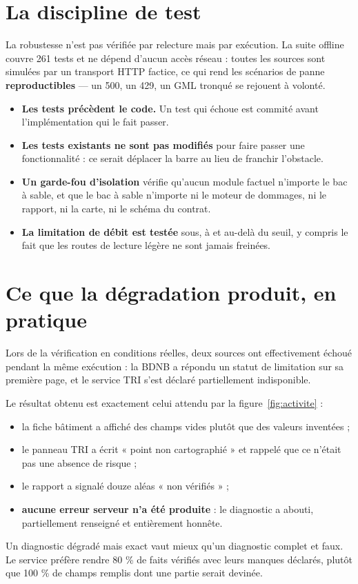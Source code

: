 \section{La discipline de test}

La robustesse n'est pas vérifiée par relecture mais par exécution. La suite
offline couvre 261 tests et ne dépend d'aucun accès réseau : toutes les sources
sont simulées par un transport HTTP factice, ce qui rend les scénarios de panne
\textbf{reproductibles} — un 500, un 429, un GML tronqué se rejouent à volonté.

\begin{itemize}
  \item \textbf{Les tests précèdent le code.} Un test qui échoue est commité
    avant l'implémentation qui le fait passer.
  \item \textbf{Les tests existants ne sont pas modifiés} pour faire passer une
    fonctionnalité : ce serait déplacer la barre au lieu de franchir l'obstacle.
  \item \textbf{Un garde-fou d'isolation} vérifie qu'aucun module factuel
    n'importe le bac à sable, et que le bac à sable n'importe ni le moteur de
    dommages, ni le rapport, ni la carte, ni le schéma du contrat.
  \item \textbf{La limitation de débit est testée} sous, à et au-delà du seuil,
    y compris le fait que les routes de lecture légère ne sont jamais freinées.
\end{itemize}

\section{Ce que la dégradation produit, en pratique}

Lors de la vérification en conditions réelles, deux sources ont effectivement
échoué pendant la même exécution : la BDNB a répondu un statut de limitation sur
sa première page, et le service TRI s'est déclaré partiellement indisponible.

Le résultat obtenu est exactement celui attendu par la figure~\ref{fig:activite} :

\begin{itemize}
  \item la fiche bâtiment a affiché des champs vides plutôt que des valeurs
    inventées ;
  \item le panneau TRI a écrit « point non cartographié » et rappelé que ce
    n'était pas une absence de risque ;
  \item le rapport a signalé douze aléas « non vérifiés » ;
  \item \textbf{aucune erreur serveur n'a été produite} : le diagnostic a abouti,
    partiellement renseigné et entièrement honnête.
\end{itemize}

\begin{encadre}[title={Le critère de réussite n'est pas le taux de succès}]
Un diagnostic dégradé mais exact vaut mieux qu'un diagnostic complet et faux. Le
service préfère rendre 80 \% de faits vérifiés avec leurs manques déclarés,
plutôt que 100 \% de champs remplis dont une partie serait devinée.
\end{encadre}
